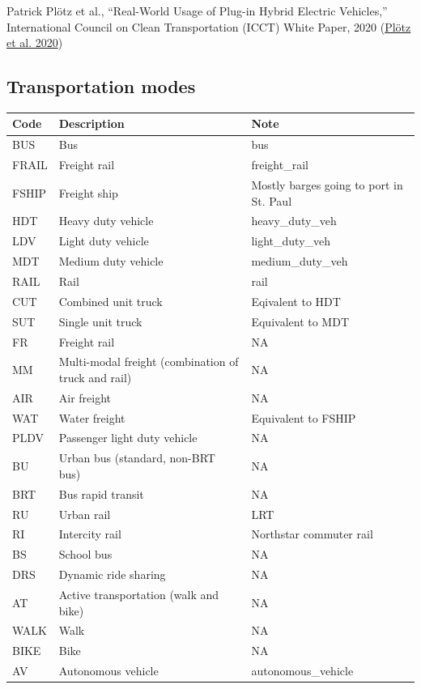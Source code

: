 \documentclass[
]{book}
\begin{document}
Patrick Plötz et al., ``Real-World Usage of Plug-in Hybrid Electric Vehicles,'' International Council on Clean Transportation (ICCT) White Paper, 2020 (\protect\hyperlink{ref-plotzRealworldUsagePlugin2020}{Plötz et al. 2020})

\hypertarget{transportation-modes}{%
\subsection{Transportation modes}\label{transportation-modes}}

\begin{longtable}{lll}
\toprule
Code & Description & Note \\ 
\midrule
BUS & Bus & bus \\ 
FRAIL & Freight rail & freight\_rail \\ 
FSHIP & Freight ship & Mostly barges going to port in St. Paul \\ 
HDT & Heavy duty vehicle & heavy\_duty\_veh \\ 
LDV & Light duty vehicle & light\_duty\_veh \\ 
MDT & Medium duty vehicle & medium\_duty\_veh \\ 
RAIL & Rail & rail \\ 
CUT & Combined unit truck & Eqivalent to HDT \\ 
SUT & Single unit truck & Equivalent to MDT \\ 
FR & Freight rail & NA \\ 
MM & Multi-modal freight (combination of truck and rail) & NA \\ 
AIR & Air freight & NA \\ 
WAT & Water freight & Equivalent to FSHIP \\ 
PLDV & Passenger light duty vehicle & NA \\ 
BU & Urban bus (standard, non-BRT bus) & NA \\ 
BRT & Bus rapid transit & NA \\ 
RU & Urban rail & LRT \\ 
RI & Intercity rail & Northstar commuter rail \\ 
BS & School bus & NA \\ 
DRS & Dynamic ride sharing & NA \\ 
AT & Active transportation (walk and bike) & NA \\ 
WALK & Walk & NA \\ 
BIKE & Bike & NA \\ 
AV & Autonomous vehicle & autonomous\_vehicle \\ 
\bottomrule
\end{longtable}
\end{document}
